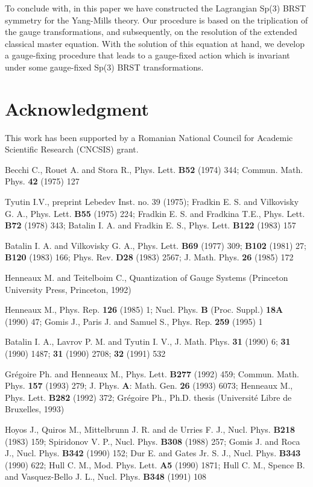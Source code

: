 \documentclass[a4paper,10pt]{article}
\begin{document}
To conclude with, in this paper we have constructed the Lagrangian Sp(3)
BRST symmetry for the Yang-Mills theory. Our procedure is based on the
triplication of the gauge transformations, and subsequently, on the
resolution of the extended classical master equation. With the solution of
this equation at hand, we develop a gauge-fixing procedure that leads to a
gauge-fixed action which is invariant under some gauge-fixed Sp(3) BRST
transformations.

\section*{Acknowledgment}
This work has been supported by a Romanian National Council for Academic
Scientific Research (CNCSIS) grant.

\begin{thebibliography}{99}
  Becchi C., Rouet A. and Stora R.,
Phys. Lett. {\bf{B52}} (1974) 344;
Commun. Math. Phys. {\bf{42}} (1975) 127

  Tyutin I.V., preprint Lebedev Inst. no. 39 (1975);
Fradkin E. S. and Vilkovisky G. A.,
Phys. Lett. {\bf{B55}} (1975) 224;
Fradkin E. S. and Fradkina T.E.,
Phys. Lett. {\bf{B72}} (1978) 343;
Batalin I. A. and Fradkin E. S.,
Phys. Lett. {\bf{B122}} (1983) 157

  Batalin I. A. and Vilkovisky G. A.,
Phys. Lett. {\bf{B69}} (1977) 309;
{\bf{B102}} (1981) 27;
{\bf{B120}} (1983) 166;
Phys. Rev. {\bf{D28}} (1983) 2567;
J. Math. Phys. {\bf{26}} (1985) 172

  Henneaux M. and Teitelboim C.,
Quantization of Gauge Systems
(Princeton University Press, Princeton, 1992)

  Henneaux M.,
Phys. Rep. {\bf{126}} (1985) 1;
Nucl. Phys. {\bf{B}} (Proc. Suppl.) {\bf{18A}} (1990) 47;
Gomis J., Paris J. and Samuel S.,
Phys. Rep. {\bf{259}} (1995) 1

  Batalin I. A., Lavrov P. M. and Tyutin I. V.,
J. Math. Phys. {\bf{31}} (1990) 6;
{\bf{31}} (1990) 1487;
{\bf{31}} (1990) 2708;
{\bf{32}} (1991) 532

  Gr\'{e}goire Ph. and Henneaux M.,
Phys. Lett. {\bf{B277}} (1992) 459;
Commun. Math. Phys. {\bf{157}} (1993) 279;
J. Phys. {\bf{A}}: Math. Gen. {\bf{26}} (1993) 6073;
Henneaux M.,
Phys. Lett. {\bf{B282}} (1992) 372;
Gr\'{e}goire Ph., Ph.D. thesis (Universit\'{e} Libre de
Bruxelles, 1993)

  Hoyos J., Quiros M., Mittelbrunn J. R. and 
de Urries F. J.,
Nucl. Phys. {\bf{B218}} (1983) 159;
Spiridonov V. P.,
Nucl. Phys. {\bf{B308}} (1988) 257;
Gomis J. and Roca J.,
Nucl. Phys. {\bf{B342}} (1990) 152;
Dur E. and Gates Jr. S. J.,
Nucl. Phys. {\bf{B343}} (1990) 622;
Hull C. M.,
Mod. Phys. Lett. {\bf{A5}} (1990) 1871;
Hull C. M., Spence B. and Vasquez-Bello J. L.,
Nucl. Phys. {\bf{B348}} (1991) 108


\end{thebibliography}
\end{document}
